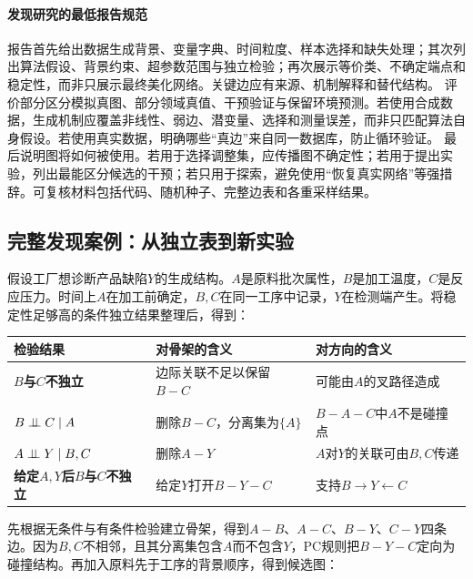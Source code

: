 \paragraph{发现研究的最低报告规范}

报告首先给出数据生成背景、变量字典、时间粒度、样本选择和缺失处理；其次列出算法假设、背景约束、超参数范围与独立检验；再次展示等价类、不确定端点和稳定性，而非只展示最终美化网络。关键边应有来源、机制解释和替代结构。
评价部分区分模拟真图、部分领域真值、干预验证与保留环境预测。若使用合成数据，生成机制应覆盖非线性、弱边、潜变量、选择和测量误差，而非只匹配算法自身假设。若使用真实数据，明确哪些“真边”来自同一数据库，防止循环验证。
最后说明图将如何被使用。若用于选择调整集，应传播图不确定性；若用于提出实验，列出最能区分候选的干预；若只用于探索，避免使用“恢复真实网络”等强措辞。可复核材料包括代码、随机种子、完整边表和各重采样结果。

\subsection{完整发现案例：从独立表到新实验}

假设工厂想诊断产品缺陷$Y$的生成结构。$A$是原料批次属性，$B$是加工温度，$C$是反应压力。时间上$A$在加工前确定，$B,C$在同一工序中记录，$Y$在检测端产生。将稳定性足够高的条件独立结果整理后，得到：

\begin{center}
\small
\begin{tabularx}{\textwidth}{>{\bfseries}p{3.0cm}X X}
\toprule
检验结果 & 对骨架的含义 & 对方向的含义\\
\midrule
$B$与$C$不独立 & 边际关联不足以保留$B-C$ & 可能由$A$的叉路径造成\\
$B\mathrel{\perp\!\!\!\perp} C\mid A$ & 删除$B-C$，分离集为$\{A\}$ & $B-A-C$中$A$不是碰撞点\\
$A\mathrel{\perp\!\!\!\perp} Y\mid B,C$ & 删除$A-Y$ & $A$对$Y$的关联可由$B,C$传递\\
给定$A,Y$后$B$与$C$不独立 & 给定$Y$打开$B-Y-C$ & 支持$B\rightarrow Y\leftarrow C$\\
\bottomrule
\end{tabularx}
\end{center}

先根据无条件与有条件检验建立骨架，得到$A-B$、$A-C$、$B-Y$、$C-Y$四条边。因为$B,C$不相邻，且其分离集包含$A$而不包含$Y$，PC规则把$B-Y-C$定向为碰撞结构。再加入原料先于工序的背景顺序，得到候选图：

\begin{center}
\end{center}

